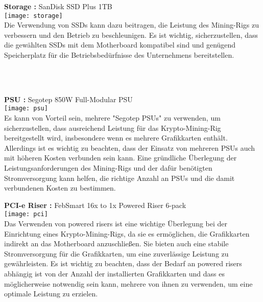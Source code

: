 \documentclass[ngerman]{scrreprt}
\begin{document}
\begin{large}
	\textbf{Storage :} SanDisk SSD Plus 1TB \\ 
	\texttt{[image: storage]}  \\
	Die Verwendung von SSDs kann dazu beitragen, die Leistung des Mining-Rigs zu verbessern und den Betrieb zu beschleunigen. Es ist wichtig, sicherzustellen, dass die gewählten SSDs mit dem Motherboard kompatibel sind und genügend Speicherplatz für die Betriebsbedürfnisse des Unternehmens bereitstellen.	\\
\end{large}
\\ \\
\begin{large}
	\textbf{PSU :} Segotep 850W Full-Modular PSU \\ 
	\texttt{[image: psu]}  \\
	Es kann von Vorteil sein, mehrere "Segotep PSUs" zu verwenden, um sicherzustellen, dass ausreichend Leistung für das Krypto-Mining-Rig bereitgestellt wird, insbesondere wenn es mehrere Grafikkarten enthält. Allerdings ist es wichtig zu beachten, dass der Einsatz von mehreren PSUs auch mit höheren Kosten verbunden sein kann. Eine gründliche Überlegung der Leistungsanforderungen des Mining-Rigs und der dafür benötigten Stromversorgung kann helfen, die richtige Anzahl an PSUs und die damit verbundenen Kosten zu bestimmen. \\
\end{large}
\newpage
\begin{large}
	\textbf{PCI-e Riser :} FebSmart 16x to 1x Powered Riser 6-pack \\ 
	\texttt{[image: pci]}  \\
	Das Verwenden von powered risers ist eine wichtige Überlegung bei der Einrichtung eines Krypto-Mining-Rigs, da sie es ermöglichen, die Grafikkarten indirekt an das Motherboard anzuschließen. Sie bieten auch eine stabile Stromversorgung für die Grafikkarten, um eine zuverlässige Leistung zu gewährleisten. Es ist wichtig zu beachten, dass der Bedarf an powered risers abhängig ist von der Anzahl der installierten Grafikkarten und dass es möglicherweise notwendig sein kann, mehrere von ihnen zu verwenden, um eine optimale Leistung zu erzielen. \\ \\ \\
	
	
\end{large}
\end{document}
